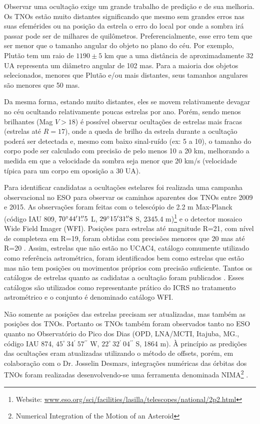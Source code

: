 \documentclass[12pt,a4paper]{monografia}
\newcommand{\degr}{\ensuremath{^{\circ}}}%
\newcommand{\arcmin}{\ensuremath{^{\prime}}}%
\newcommand{\arcsec}{\ensuremath{^{\prime\prime}}}%
\newcommand{\farcs}{\mbox{\ensuremath{.\!\!^{\prime\prime}}}}%
\begin{document}
\indent \indent Observar uma ocultação exige um grande trabalho de predição e de sua melhoria. Os TNOs estão muito distantes significando que mesmo sem grandes erros nas suas efemérides ou na posição da estrela o erro do local por onde a sombra irá passar pode ser de milhares de quilômetros. Preferencialmente, esse erro tem que ser menor que o tamanho angular do objeto no plano do céu. Por exemplo, Plutão tem um raio de $1190 \pm 5$ km \cite[submetido]{DiasOliveira2015} que a uma distância de aproximadamente 32 UA representa um diâmetro angular de 102 mas. Para a maioria dos objetos selecionados, menores que Plutão e/ou mais distantes, seus tamanhos angulares são menores que 50 mas.

Da mesma forma, estando muito distantes, eles se movem relativamente devagar no céu ocultando relativamente poucas estrelas por ano. Porém, sendo menos brilhantes (Mag $V > 18$) é possível observar ocultações de estrelas mais fracas (estrelas até $R = 17$), onde a queda de brilho da estrela durante a ocultação poderá ser detectada e, mesmo com baixo sinal-ruído (ex: 5 a 10), o tamanho do corpo pode ser calculado com precisão de pelo menos 10 a 20 km, melhorando a medida em que a velocidade da sombra seja menor que 20 km/s (velocidade típica para um corpo em oposição a 30 UA).

Para identificar candidatas a ocultações estelares foi realizada uma campanha observacional no ESO para observar os caminhos aparentes dos TNOs entre 2009 e 2015. As observações foram feitas com o telescópio de 2.2 m Max-Planck (código IAU 809, $70\degr44\arcmin1\farcs5$ L, $29\degr15\arcmin31\farcs8$ S, 2345.4 m)\footnote{Website: \url{www.eso.org/sci/facilities/lasilla/telescopes/national/2p2.html}} e o detector mosaico Wide Field Imager (WFI). Posições para estrelas até magnitude R=21, com nível de completeza em R=19, foram obtidas com precisões menores que 20 mas até R=20 \citep{Assafin2012}. Assim, estrelas que não estão no UCAC4, catálogo comumente utilizado como referência astrométrica, foram identificados bem como estrelas que estão mas não tem posições ou movimentos próprios com precisão suficiente. Tantos os catálogos de estrelas quanto as cadidatas a ocultação foram publicados \citep{Assafin2010, Assafin2012, Camargo2013}. Esses catálogos são utilizados como representante prático do ICRS no tratamento astrométrico e o conjunto é denominado catálogo WFI.

Não somente as posições das estrelas precisam ser atualizadas, mas também as posições dos TNOs. Portanto os TNOs também foram observados tanto no ESO quanto no Observatório do Pico dos Dias (OPD, LNA/MCTI, Itajuba, MG., código IAU 874, $45^{\circ} ~34\arcmin ~57\arcsec$ W, $22^{\circ} ~32\arcmin ~04\arcsec$ S, 1864 m). À princípio as predições das ocultações eram atualizadas utilizando o método de offsets, porém, em colaboração com o Dr. Josselin Desmars, integrações numéricas das órbitas dos TNOs foram realizadas desenvolvendo-se uma ferramenta denominada NIMA\footnote{Numerical Integration of the Motion of an Asteroid} \citep[submetido]{Desmars2015}.
\end{document}
